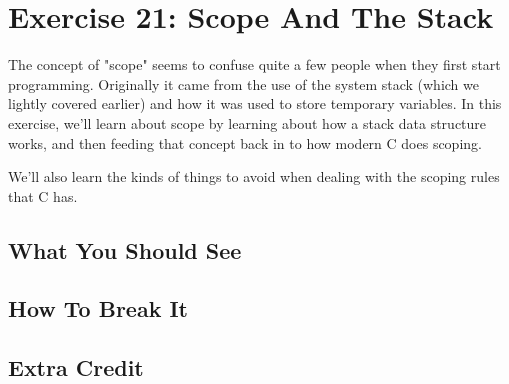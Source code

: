 \chapter{Exercise 21: Scope And The Stack}

The concept of "scope" seems to confuse quite a few people when they first
start programming.  Originally it came from the use of the system stack
(which we lightly covered earlier) and how it was used to store temporary
variables.  In this exercise, we'll learn about scope by learning about
how a stack data structure works, and then feeding that concept back in
to how modern C does scoping.

We'll also learn the kinds of things to avoid when dealing with the
scoping rules that C has.


\section{What You Should See}


\section{How To Break It}


\section{Extra Credit}



